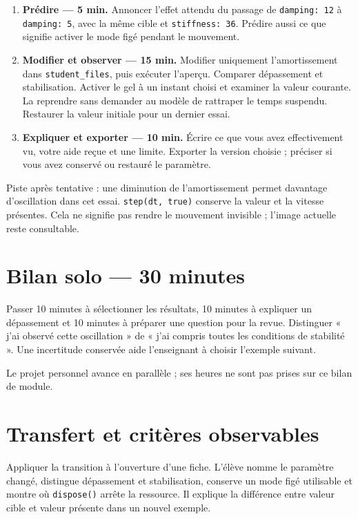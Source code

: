 \documentclass[
  canadien,
  11pt,
  a4paper,
]{report}
\providecommand{\tightlist}{%
  \setlength{\itemsep}{0pt}\setlength{\parskip}{0pt}}
\begin{document}
\begin{enumerate}
\def\labelenumi{\arabic{enumi}.}
\tightlist
\item
  \textbf{Prédire --- 5 min.} Annoncer l'effet attendu du passage de
  \texttt{damping:\ 12} à \texttt{damping:\ 5}, avec la même cible et
  \texttt{stiffness:\ 36}. Prédire aussi ce que signifie activer le mode
  figé pendant le mouvement.
\item
  \textbf{Modifier et observer --- 15 min.} Modifier uniquement
  l'amortissement dans \texttt{student\_\allowbreak{}files}, puis exécuter l'aperçu.
  Comparer dépassement et stabilisation. Activer le gel à un instant
  choisi et examiner la valeur courante. La reprendre sans demander au
  modèle de rattraper le temps suspendu. Restaurer la valeur initiale
  pour un dernier essai.
\item
  \textbf{Expliquer et exporter --- 10 min.} Écrire ce que vous avez
  effectivement vu, votre aide reçue et une limite. Exporter la version
  choisie ; préciser si vous avez conservé ou restauré le paramètre.
\end{enumerate}

Piste après tentative : une diminution de l'amortissement permet
davantage d'oscillation dans cet essai. \texttt{step(dt,\ true)}
conserve la valeur et la vitesse présentes. Cela ne signifie pas rendre
le mouvement invisible ; l'image actuelle reste consultable.

\section{Bilan solo --- 30 minutes}\label{bilan-solo-30-minutes-4}

Passer 10 minutes à sélectionner les résultats, 10 minutes à expliquer
un dépassement et 10 minutes à préparer une question pour la revue.
Distinguer « j'ai observé cette oscillation » de « j'ai compris toutes
les conditions de stabilité ». Une incertitude conservée aide
l'enseignant à choisir l'exemple suivant.

Le projet personnel avance en parallèle ; ses heures ne sont pas prises
sur ce bilan de module.

\section{Transfert et critères
observables}\label{transfert-et-crituxe8res-observables-4}

Appliquer la transition à l'ouverture d'une fiche. L'élève nomme le
paramètre changé, distingue dépassement et stabilisation, conserve un
mode figé utilisable et montre où \texttt{dispose()} arrête la
ressource. Il explique la différence entre valeur cible et valeur
présente dans un nouvel exemple.
\end{document}
